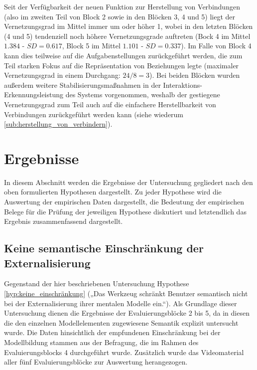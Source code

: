 Seit der Verfügbarkeit der neuen Funktion zur Herstellung von Verbindungen (also im zweiten Teil von Block 2 sowie in den Blöcken 3, 4 und 5) liegt der Vernetzungsgrad im Mittel immer um oder höher 1, wobei in den letzten Blöcken (4 und 5) tendenziell noch höhere Vernetzungsgrade auftreten (Bock 4 im Mittel $1.384$ - $SD=0.617$, Block 5 im Mittel $1.101$ - $SD=0.337$). Im Falle von Block 4 kann dies teilweise auf die Aufgabenstellungen zurückgeführt werden, die zum Teil starken Fokus auf die Repräsentation von Beziehungen legte (maximaler Vernetzungsgrad in einem Durchgang: $24/8=3$). Bei beiden Blöcken wurden außerdem weitere Stabilisierungsmaßnahmen in der Interaktions-Erkennungsleistung des Systems vorgenommen, weshalb der gestiegene Vernetzungsgrad zum Teil auch auf die einfachere Herstellbarkeit von Verbindungen zurückgeführt werden kann (siehe wiederum \ref{sub:herstellung_von_verbindern}).


\section{Ergebnisse} %
\label{sec:m_ergebnisse}

In diesem Abschnitt werden die Ergebnisse der Untersuchung gegliedert nach den oben formulierten Hypothesen dargestellt. Zu jeder Hypothese wird die Auswertung der empirischen Daten dargestellt, die Bedeutung der empirischen Belege für die Prüfung der jeweiligen Hypothese diskutiert und letztendlich das Ergebnis zusammenfassend dargestellt.  

\subsection{Keine semantische Einschränkung der Externalisierung} %
\label{sub:keine_semantische_einschränkung_der_externalisierung}

Gegenstand der hier beschriebenen Untersuchung Hypothese \ref{hyp:keine_einschränkung} („Das Werkzeug schränkt Benutzer semantisch nicht bei der Externalisierung ihrer mentalen Modelle ein.“). Als Grundlage dieser Untersuchung dienen die Ergebnisse der Evaluierungsblöcke 2 bis 5, da in diesen die den einzelnen Modellelementen zugewiesene Semantik explizit untersucht wurde. Die Daten hinsichtlich der empfundenen Einschränkung bei der Modellbildung stammen aus der Befragung, die im Rahmen des Evaluierungsblocks 4 durchgeführt wurde. Zusätzlich wurde das Videomaterial aller fünf Evaluierungsblöcke zur Auswertung herangezogen.

